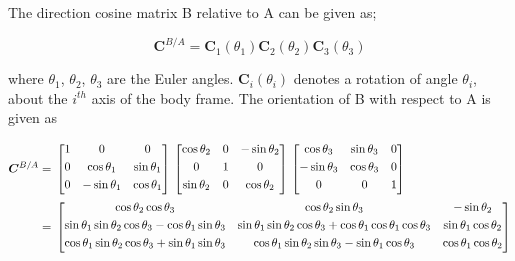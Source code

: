 The direction cosine matrix B relative to A can be given as;

\begin{equation}
\label{eqn:sequentialOrientation}
\bm{C}^{B/A}= \bm{C}_{1}(\theta_{1}) \bm{C}_{2}(\theta_{2}) \bm{C}_{3}(\theta_{3})
\end{equation}

where $\theta_{1}$, $\theta_{2}$, $\theta_{3}$ are the Euler angles. $\bm{C}_{i}(\theta_{i})$  
denotes a rotation of angle $\theta_{i}$, about the $i^{th}$ axis of the body frame. The orientation of B with respect to A is given as

\begin{align}{\label{eqn:C_B_AmatrixEuler}}
\begin{split}
\bm{C}^{B/A}
& =\,
\begin{bmatrix}
1 & 0 & 0\\[0.3em]
0 & \cos\theta_1 & \sin\theta_1\\[0.3em]
0 & -\sin\theta_1 & \cos\theta_1\\[0.3em]
\end{bmatrix}
\,
\begin{bmatrix}
\cos\theta_2 & 0 & -\sin\theta_2\\[0.3em]
0 & 1 &0\\[0.3em]
\sin\theta_2 & 0 & \cos\theta_2\\[0.3em]
\end{bmatrix}
\,
\begin{bmatrix}
\cos\theta_3 & \sin\theta_3 & 0\\[0.3em]
-\sin\theta_3 & \cos\theta_3 & 0\\[0.3em]
0 & 0 & 1\\[0.3em]
\end{bmatrix}
\\
& =\,
\begin{bmatrix}
\cos\theta_2 \cos\theta_3 & \cos\theta_2 \sin\theta_3 & -\sin\theta_2\\[0.3em]
\sin\theta_1 \sin\theta_2 \cos\theta_3 - \cos\theta_1 \sin\theta_3 & \sin\theta_1 \sin\theta_2 \cos\theta_3 + \cos\theta_1 \cos\theta_1 \cos\theta_3 & \sin\theta_1 \cos\theta_2\\[0.3em]
\cos\theta_1 \sin\theta_2 \cos\theta_3 + \sin\theta_1 \sin\theta_3 & \cos\theta_1 \sin\theta_2 \sin\theta_3 - \sin\theta_1 \cos\theta_3 & \cos\theta_1 \cos\theta_2\\[0.3em]
\end{bmatrix}
\end{split}
\end{align}


